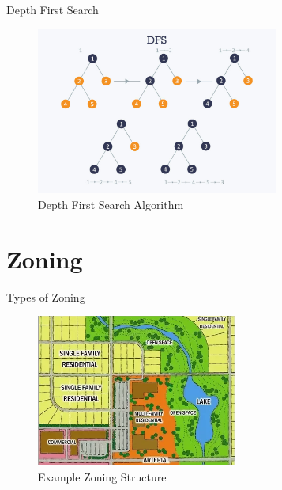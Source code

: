 \documentclass[10pt, aspectratio=169]{beamer}
\begin{document}
    \begin{frame}{Depth First Search}
        \begin{center}
            \begin{figure}
                \centering
                \includegraphics[height=5.5cm, keepaspectratio]{images/depthfirstsearch.jpg}
                \caption{Depth First Search Algorithm \cite{depthfirstsearch}}
            \end{figure}
        \end{center}
    \end{frame}
    
    
    \section{Zoning}
    
    \begin{frame}[fragile]{Types of Zoning}
        \begin{figure}
            \centering
            \includegraphics[height=5cm, keepaspectratio]{images/zoning.png}
            \caption{Example Zoning Structure \cite{zoningdiagram}}
        \end{figure}
    \end{frame}
    
\end{document}
